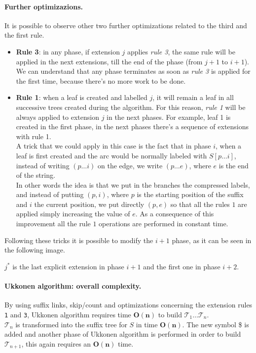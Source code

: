 \paragraph*{Further optimizazions.} It is possible to observe other two further optimizations related to the third and the first rule.\\
\begin{itemize}
	\item \textbf{Rule 3}: in any phase, if extension $j$ applies \textit{rule 3}, the same rule will be applied in the next extensions, till the end of the phase (from $j+
	1$ to $i+1$). We can understand that any phase terminates as soon as \textit{rule 3} is applied for the first time, because there's no more work to be done.
	\item \textbf{Rule 1}: when a leaf is created and labelled $j$, it will remain a leaf in all successive trees created during the algorithm. For this reason, \textit{rule 1} will be always applied to extension $j$ in the next phases. For example, leaf 1 is created in the first phase, in the next phases there's a sequence of extensions with rule 1.\\
	A trick that we could apply in this case is the fact that in phase $i$, when a leaf is first created and the arc would be normally labeled with $S[p \dots i]$, instead of writing $(p \dots i)$ on the edge, we write $(p \dots e)$, where $e$ is the end of the string.\\
	
	In other words the idea is that we put in the branches the compressed labels, and instead of putting $(p,i)$, where $p$ is the starting position of the suffix and $i$ the current position, we put directly $(p,e)$ so that all the rules $1$ are applied simply increasing the value of $e$. As a consequence of this improvement all the rule $1$ operations are performed in constant time.
\end{itemize}
Following these tricks it is possible to modify the $i+1$ phase, as it can be seen in the following image.

$j^*$ is the last explicit extension in phase $i+1$ and the first one in phase $i+2$.

\paragraph*{Ukkonen algorithm: overall complexity.} By using suffix links, skip/count and optimizations concerning the extension rules \verb|1| and \verb|3|, Ukkonen algorithm requires time $\mathbf{O(n)}$ to build $\mathcal{T}_1 \dots \mathcal{T}_n$.\\
$\mathcal{T}_n$ is transformed into the suffix tree for $S$ in time $\mathbf{O(n)}$. The new symbol \$ is added and another phase of Ukkonen algorithm is performed in order to build $\mathcal{T}_{n+1}$, this again requires an $\mathbf{O(n)}$ time. 

